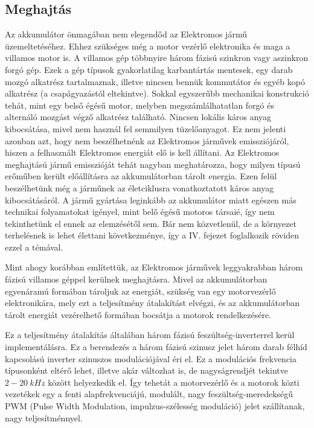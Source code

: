 \subsection{Meghajtás}

Az akkumulátor önmagában nem elegendőd az Elektromos jármű üzemeltetéséhez. Ehhez szükséges még a motor vezérlő elektronika és maga a villamos motor is. A villamos gép többnyire három fázisú szinkron vagy aszinkron forgó gép. Ezek a gép típusok gyakorlatilag karbantártás mentesek, egy darab mozgó alkatrész tartalmaznak, illetve nincsen bennük kommutátor és egyéb kopó alkatrész (a csapágyazástól eltekintve). Sokkal egyszerűbb mechanikai konstrukció tehát, mint egy belső égésű motor, melyben megszámlálhatatlan forgó és alternáló mozgást végző alkatrész található. Nincsen lokális káros anyag kibocsátása, mivel nem használ fel semmilyen tüzelőanyagot. Ez nem jelenti azonban azt, hogy nem beszélhetnénk az Elektromos járművek emissziójáról, hiszen a felhasznált Elektromos energiát elő is kell állítani. Az Elektromos meghajtású jármű emisszióját tehát nagyban meghatározza, hogy milyen típusú erőműben került előállításra az akkumulátorban tárolt energia. Ezen felül beszélhetünk még a járműnek az életciklusra vonatkoztatott káros anyag kibocsátásáról. A jármű gyártása leginkább az akkumulátor miatt egészen más technikai folyamatokat igényel, mint belő égésű motoros társaié, így nem tekinthetünk el ennek az elemzésétől sem. Bár nem közvetlenül, de a környezet terhelésnek is lehet élettani következménye, így a IV. fejezet foglalkozik röviden ezzel a témával.

Mint ahogy korábban említettük, az Elektromos járművek leggyakrabban három fázisú villamos géppel kerülnek meghajtásra. Mivel az akkumulátorban egyenáramú formában tároljuk az energiát, szükség van egy motorvezérlő elektronikára, mely ezt a teljesítmény átalakítást elvégzi, és az akkumulátorban tárolt energiát vezérelhető formában bocsátja a motorok rendelkezésére.

Ez a teljesítmény átalakítás általában három fázisú feszültség-inverterrel kerül implementálásra. Ez a berendezés a három fázisú szinusz jelet három darab félhíd kapcsolású inverter szinuszos modulációjával éri el. Ez a modulációs frekvencia típusonként eltérő lehet, illetve akár változhat is, de nagyságrendjét tekintve $2 - 20\ kHz$ között helyezkedik el. Így tehetát a motorvezérlő és a motorok közti vezetékek egy a fenti alapfrekvenciájú, modulált, nagy feszültség-meredekségű PWM (Pulse Width Modulation, impulzus-szélesség moduláció) jelet szállítanak, nagy teljesítménnyel.

